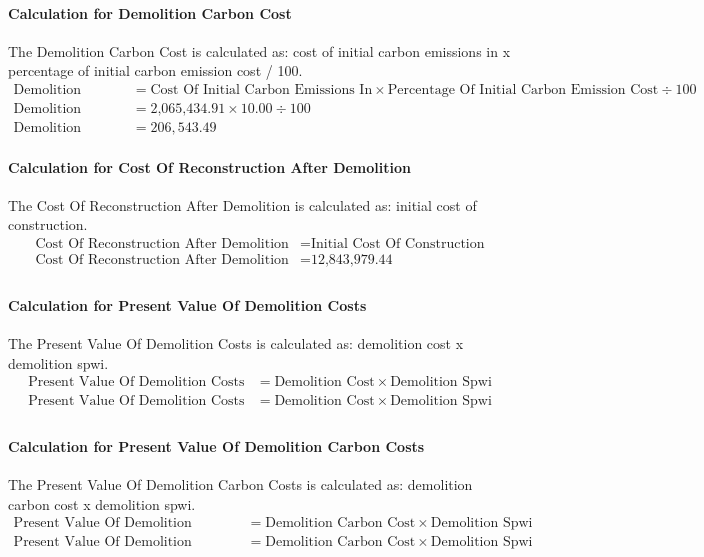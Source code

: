 \documentclass{article}
\begin{document}
 \paragraph{Calculation for Demolition Carbon Cost} 
The Demolition Carbon Cost is calculated as: cost of initial carbon emissions in x percentage of initial carbon emission cost / 100.
\begin{align*}
 \text{Demolition Carbon Cost} &= \text{Cost Of Initial Carbon Emissions In} \times \text{Percentage Of Initial Carbon Emission Cost} \div 100 \\
 \text{Demolition Carbon Cost} &= \text{2,065,434.91} \times 10.00 \div 100 \\
 \text{Demolition Carbon Cost} &= 206,543.49 
\end{align*}
 \paragraph{Calculation for Cost Of Reconstruction After Demolition} 
The Cost Of Reconstruction After Demolition is calculated as: initial cost of construction.
\begin{align*}
 \text{Cost Of Reconstruction After Demolition} &= \text{Initial Cost Of Construction} \\
 \text{Cost Of Reconstruction After Demolition} &= \text{12,843,979.44} \\
\end{align*}
 \paragraph{Calculation for Present Value Of Demolition Costs} 
The Present Value Of Demolition Costs is calculated as: demolition cost x demolition spwi.
\begin{align*}
 \text{Present Value Of Demolition Costs} &= \text{Demolition Cost} \times \text{Demolition Spwi} \\
 \text{Present Value Of Demolition Costs} &= \text{Demolition Cost} \times \text{Demolition Spwi} \\
\end{align*}
 \paragraph{Calculation for Present Value Of Demolition Carbon Costs} 
The Present Value Of Demolition Carbon Costs is calculated as: demolition carbon cost x demolition spwi.
\begin{align*}
 \text{Present Value Of Demolition Carbon Costs} &= \text{Demolition Carbon Cost} \times \text{Demolition Spwi} \\
 \text{Present Value Of Demolition Carbon Costs} &= \text{Demolition Carbon Cost} \times \text{Demolition Spwi} \\
\end{align*}
\end{document}
